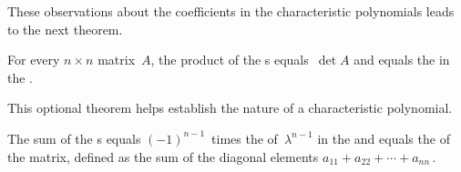 These observations about the coefficients in the characteristic polynomials leads to the next theorem.

\begin{theorem} \label{thm:charpolyc}
For every \(n\times n\) matrix~\(A\), the product of the s equals~\(\det A\) and equals the  in the .  
\begin{aside}
This optional theorem helps establish the nature of a characteristic polynomial.
\end{aside}
The sum of the s equals \((-1)^{n-1}\)~times the  of~\(\lambda^{n-1}\) in the  and equals the  of the matrix, defined as the sum of the diagonal elements \(a_{11}+a_{22}+\cdots+a_{nn}\)\,.
\end{theorem}

